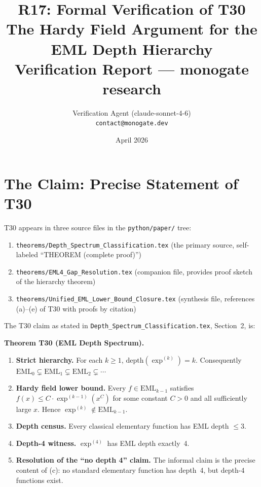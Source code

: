\documentclass[12pt,a4paper]{article}
\title{R17: Formal Verification of T30\\
       \large The Hardy Field Argument for the EML Depth Hierarchy\\
       \normalsize Verification Report --- monogate research}
\author{Verification Agent (claude-sonnet-4-6)\\
\small \texttt{contact@monogate.dev}}
\date{April 2026}
\theoremstyle{definition}
\theoremstyle{remark}
\begin{document}
\maketitle
\tableofcontents

\section{The Claim: Precise Statement of T30}

T30 appears in three source files in the \texttt{python/paper/} tree:
\begin{enumerate}
  \item \texttt{theorems/Depth\_Spectrum\_Classification.tex} (the primary source,
        self-labeled ``THEOREM (complete proof)'')
  \item \texttt{theorems/EML4\_Gap\_Resolution.tex} (companion file, provides
        proof sketch of the hierarchy theorem)
  \item \texttt{theorems/Unified\_EML\_Lower\_Bound\_Closure.tex} (synthesis
        file, references (a)--(e) of T30 with proofs by citation)
\end{enumerate}

The T30 claim as stated in \texttt{Depth\_Spectrum\_Classification.tex},
Section~2, is:

\medskip
\noindent\textbf{Theorem T30 (EML Depth Spectrum).}
\begin{enumerate}
  \item[\textbf{(a)}] \textbf{Strict hierarchy.} For each $k\geq 1$,
        $\mathrm{depth}(\exp^{(k)})=k$.  Consequently
        $\mathrm{EML}_0\subsetneq\mathrm{EML}_1\subsetneq\mathrm{EML}_2
        \subsetneq\cdots$

  \item[\textbf{(b)}] \textbf{Hardy field lower bound.} Every
        $f\in\mathrm{EML}_{k-1}$ satisfies
        $f(x)\leq C\cdot\exp^{(k-1)}(x^C)$
        for some constant $C>0$ and all sufficiently large $x$.
        Hence $\exp^{(k)}\notin\mathrm{EML}_{k-1}$.

  \item[\textbf{(c)}] \textbf{Depth census.} Every classical elementary
        function has EML depth $\leq 3$.

  \item[\textbf{(d)}] \textbf{Depth-4 witness.} $\exp^{(4)}$ has EML
        depth exactly~4.

  \item[\textbf{(e)}] \textbf{Resolution of the ``no depth 4'' claim.}
        The informal claim is the precise content of (c): no standard
        elementary function has depth~4, but depth-4 functions exist.
\end{enumerate}
\end{document}
